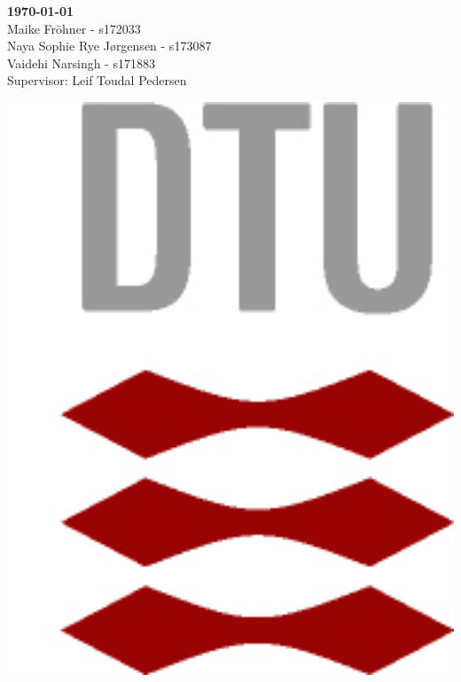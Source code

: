 \documentclass[11pt, a4paper]{article}
\begin{document}
\begin{titlepage}
	
	
	\begin{minipage}{0.5\textwidth}
		\begin{flushleft}
			\textbf{\today} \\
			\vspace{0.1cm} 
			Maike Fröhner - s172033 \\
			Naya Sophie Rye Jørgensen - s173087 \\
			Vaidehi Narsingh - s171883 \\
			\vspace{0.1cm}
			Supervisor: Leif Toudal Pedersen
			
			
			
		\end{flushleft}
	\end{minipage}
	\hfill
	\begin{minipage}{0.1\textwidth}
		\begin{flushright}
			\includegraphics[width=1\textwidth]{DTU_logo1.png}
		\end{flushright}
	\end{minipage}\\	%
	

\end{titlepage}
\end{document}
